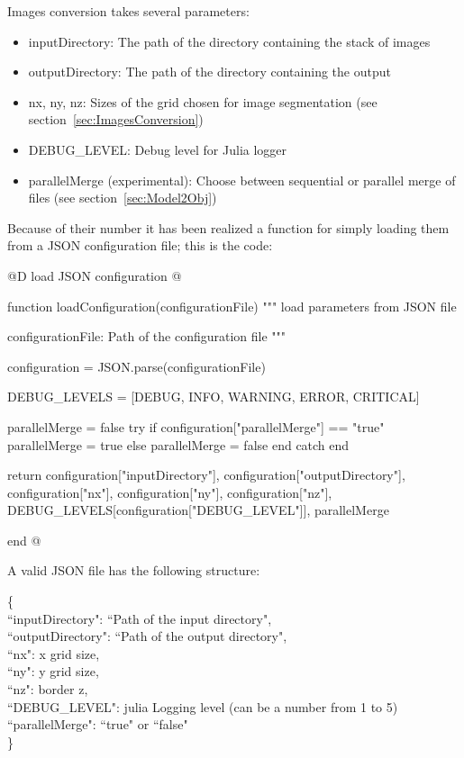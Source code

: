 \documentclass[11pt,oneside]{article}	%
\begin{document}
Images conversion takes several parameters:

\begin{itemize}
 \item inputDirectory: The path of the directory containing the stack of images
 \item outputDirectory: The path of the directory containing the output
 \item nx, ny, nz: Sizes of the grid chosen for image segmentation (see section~\ref{sec:ImagesConversion})
 \item DEBUG\_LEVEL: Debug level for Julia logger
 \item parallelMerge (experimental): Choose between sequential or parallel merge of files (see section~\ref{sec:Model2Obj})
\end{itemize}

Because of their number it has been realized a function for simply loading them from a JSON configuration file; this is the code:

@D load JSON configuration
@{function loadConfiguration(configurationFile)
  """
  load parameters from JSON file

  configurationFile: Path of the configuration file
  """

  configuration = JSON.parse(configurationFile)

  DEBUG_LEVELS = [DEBUG, INFO, WARNING, ERROR, CRITICAL]

  parallelMerge = false
  try
    if configuration["parallelMerge"] == "true"
      parallelMerge = true
    else
      parallelMerge = false
    end
  catch
  end
   
  return configuration["inputDirectory"], configuration["outputDirectory"],
        configuration["nx"], configuration["ny"], configuration["nz"],
        DEBUG_LEVELS[configuration["DEBUG_LEVEL"]],
        parallelMerge

end
@}

A valid JSON file has the following structure:
\begin{tabbing}
\{ \= \\
\>  ``inputDirectory": ``Path of the input directory",\\
\>  ``outputDirectory": ``Path of the output directory",\\
\>  ``nx": x grid size,\\
\>  ``ny": y grid size,\\
\>  ``nz": border z,\\
\>  ``DEBUG\_LEVEL": julia Logging level (can be a number from 1 to 5)\\
\>  ``parallelMerge": ``true" or ``false" \\
\}\\
\end{tabbing}
\end{document}
